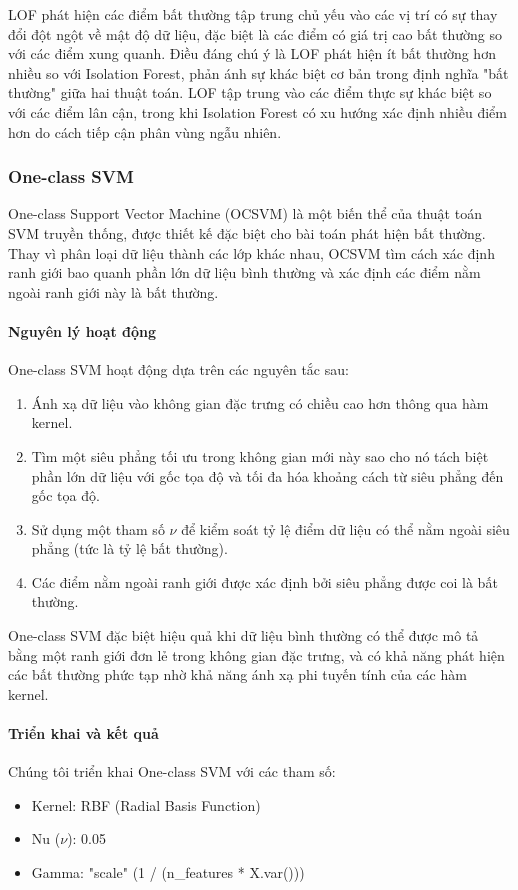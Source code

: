 LOF phát hiện các điểm bất thường tập trung chủ yếu vào các vị trí có sự thay đổi đột ngột về mật độ dữ liệu, đặc biệt là các điểm có giá trị cao bất thường so với các điểm xung quanh. Điều đáng chú ý là LOF phát hiện ít bất thường hơn nhiều so với Isolation Forest, phản ánh sự khác biệt cơ bản trong định nghĩa "bất thường" giữa hai thuật toán. LOF tập trung vào các điểm thực sự khác biệt so với các điểm lân cận, trong khi Isolation Forest có xu hướng xác định nhiều điểm hơn do cách tiếp cận phân vùng ngẫu nhiên.

\subsubsection{One-class SVM}

One-class Support Vector Machine (OCSVM) là một biến thể của thuật toán SVM truyền thống, được thiết kế đặc biệt cho bài toán phát hiện bất thường. Thay vì phân loại dữ liệu thành các lớp khác nhau, OCSVM tìm cách xác định ranh giới bao quanh phần lớn dữ liệu bình thường và xác định các điểm nằm ngoài ranh giới này là bất thường.

\paragraph{Nguyên lý hoạt động}
One-class SVM hoạt động dựa trên các nguyên tắc sau:
\begin{enumerate}
    \item Ánh xạ dữ liệu vào không gian đặc trưng có chiều cao hơn thông qua hàm kernel.
    \item Tìm một siêu phẳng tối ưu trong không gian mới này sao cho nó tách biệt phần lớn dữ liệu với gốc tọa độ và tối đa hóa khoảng cách từ siêu phẳng đến gốc tọa độ.
    \item Sử dụng một tham số $\nu$ để kiểm soát tỷ lệ điểm dữ liệu có thể nằm ngoài siêu phẳng (tức là tỷ lệ bất thường).
    \item Các điểm nằm ngoài ranh giới được xác định bởi siêu phẳng được coi là bất thường.
\end{enumerate}

One-class SVM đặc biệt hiệu quả khi dữ liệu bình thường có thể được mô tả bằng một ranh giới đơn lẻ trong không gian đặc trưng, và có khả năng phát hiện các bất thường phức tạp nhờ khả năng ánh xạ phi tuyến tính của các hàm kernel.

\paragraph{Triển khai và kết quả}
Chúng tôi triển khai One-class SVM với các tham số:
\begin{itemize}
    \item Kernel: RBF (Radial Basis Function)
    \item Nu ($\nu$): 0.05
    \item Gamma: "scale" (1 / (n\_features * X.var()))
\end{itemize}

